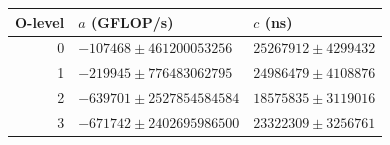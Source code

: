 \begin{tabular}{rll}
\toprule
O-level & $a$ (GFLOP/s) & $c$ (ns) \\
\midrule
0 & $-107468 \pm 461200053256$ & $25267912 \pm 4299432$ \\
1 & $-219945 \pm 776483062795$ & $24986479 \pm 4108876$ \\
2 & $-639701 \pm 2527854584584$ & $18575835 \pm 3119016$ \\
3 & $-671742 \pm 2402695986500$ & $23322309 \pm 3256761$ \\
\bottomrule
\end{tabular}
